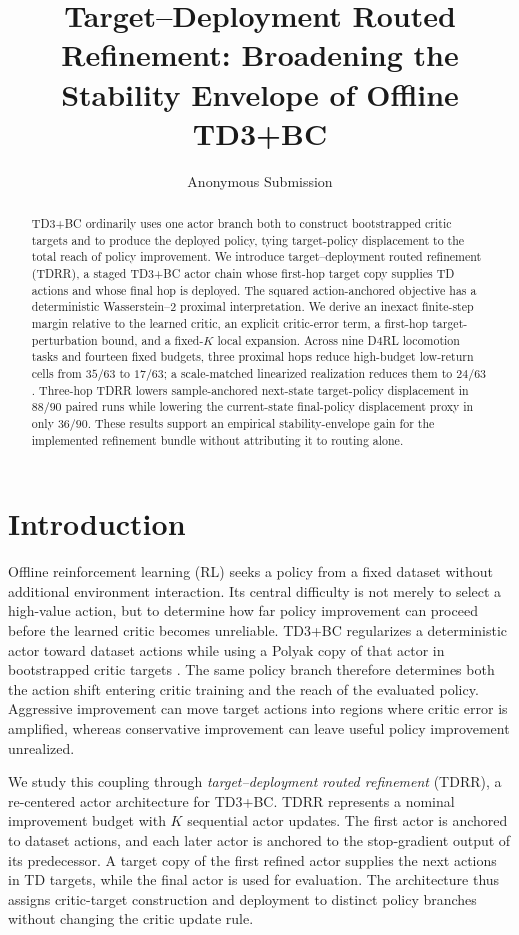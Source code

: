 \documentclass[letterpaper]{article}
\title{Target--Deployment Routed Refinement: Broadening the Stability Envelope of Offline TD3+BC}
\author{Anonymous Submission}
\begin{document}
\maketitle

\begin{abstract}
TD3+BC ordinarily uses one actor branch both to construct bootstrapped critic targets and to produce the deployed policy, tying target-policy displacement to the total reach of policy improvement. We introduce target--deployment routed refinement (TDRR), a staged TD3+BC actor chain whose first-hop target copy supplies TD actions and whose final hop is deployed. The squared action-anchored objective has a deterministic Wasserstein--2 proximal interpretation. We derive an inexact finite-step margin relative to the learned critic, an explicit critic-error term, a first-hop target-perturbation bound, and a fixed-$K$ local expansion. Across nine D4RL locomotion tasks and fourteen fixed budgets, three proximal hops reduce high-budget low-return cells from $35/63$ to $17/63$; a scale-matched linearized realization reduces them to $24/63$. Three-hop TDRR lowers sample-anchored next-state target-policy displacement in $88/90$ paired runs while lowering the current-state final-policy displacement proxy in only $36/90$. These results support an empirical stability-envelope gain for the implemented refinement bundle without attributing it to routing alone.
\end{abstract}

\section{Introduction}
\label{sec:introduction}

Offline reinforcement learning (RL) seeks a policy from a fixed dataset without additional environment interaction. Its central difficulty is not merely to select a high-value action, but to determine how far policy improvement can proceed before the learned critic becomes unreliable. TD3+BC regularizes a deterministic actor toward dataset actions while using a Polyak copy of that actor in bootstrapped critic targets \citep{fujimoto2021minimalist}. The same policy branch therefore determines both the action shift entering critic training and the reach of the evaluated policy. Aggressive improvement can move target actions into regions where critic error is amplified, whereas conservative improvement can leave useful policy improvement unrealized.

We study this coupling through \emph{target--deployment routed refinement} (TDRR), a re-centered actor architecture for TD3+BC. TDRR represents a nominal improvement budget with $K$ sequential actor updates. The first actor is anchored to dataset actions, and each later actor is anchored to the stop-gradient output of its predecessor. A target copy of the first refined actor supplies the next actions in TD targets, while the final actor is used for evaluation. The architecture thus assigns critic-target construction and deployment to distinct policy branches without changing the critic update rule.
\end{document}
